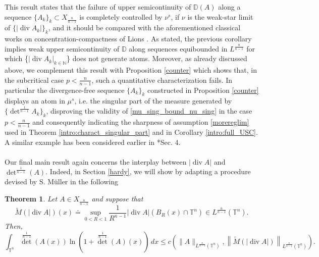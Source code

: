 \documentclass[10pt,reqno]{amsart}
\numberwithin{equation}{section}
\newcommand{\T}{\mathbb{T}}
\newcommand{\N}{\mathbb{N}}
\newcommand{\D}{\mathbb{D}}
\DeclareMathOperator{\dv}{div}
\theoremstyle{plain}
\newtheorem{Teo}{Theorem}[section]
\theoremstyle{definition}
\theoremstyle{remark}
\begin{document}
This result states that the failure of upper semicontinuity of $\D(A)$ along a sequence $\{A_k\}_k \subset X_{\frac{n}{n-1}}$ is completely controlled by $\nu^s$, if $\nu$ is the weak-star limit of $\{|\dv A_k|\}_k$, and it should be compared with the aforementioned classical works on concentration-compactness of Lions \cite{PLL1,PLL2,PLL3,PLL4}. As stated,  the previous corollary implies weak upper semicontinuity of $\D$ along sequences equibounded in $L^\frac{n}{n-1}$ for which \{$| \dv A_k|_{k \in \N}$\} does not generate atoms. Moreover,  as already discussed above, we complement this result with Proposition \ref{counter}  which shows that, in the subcritical case $p<\frac{n}{n-1}$,  such a quantitative characterization fails. In particular the divergence-free sequence $\{A_k\}_k$ constructed in Proposition \ref{counter} displays an atom in $\mu^s$, i.e. the singular part of the measure generated by  $\{\det^\frac{1}{n-1} A_k\}_k$,  disproving the validity of \eqref{mu_sing_bound_nu_sing} in the case $p<\frac{n}{n-1}$ and consequently indicating the sharpness of assumption \eqref{morereglim} used in Theorem \ref{intro:charact_singular_part} and in Corollary \ref{intro:full_USC}. A similar example has been considered earlier in \cite{Serre21}*{Sec. 4}. 
\\
\\
Our final main result again concerns the interplay between $|\dv A|$ and ${\det}^\frac{1}{n-1}(A)$. Indeed, in Section \ref{hardy}, we will show by adapting a procedure devised by S. M\"uller in \cite{MULDET,MULDETPOS} the following
\begin{Teo}\label{intro:det_hardy}
Let $A \in X_{\frac{n}{n-1}}$ and suppose that
\begin{equation}\label{gencond}
\tilde M \left(|\dv A|\right) (x)\doteq\sup_{0 <R <1}\frac{1}{R^{n-1}}|\dv A|(B_R(x)\cap \T^n) \in L^\frac{n}{n-1}(\T^n).
\end{equation}
Then,
\begin{equation}\label{llogl}
\int_{\T^n}{\det}^{\frac{1}{n -1}}(A(x))\ln\left(1 + {\det}^{\frac{1}{n-1}}(A)(x)\right) \,dx \leq c\left(\|A\|_{L^{\frac{n}{n-1}}(\T^n)}, \left\|\tilde M \left(|\dv A|\right)\right\|_{L^{\frac{n}{n-1}}(\T^n)}\right).
\end{equation}
\end{Teo}
\end{document}
